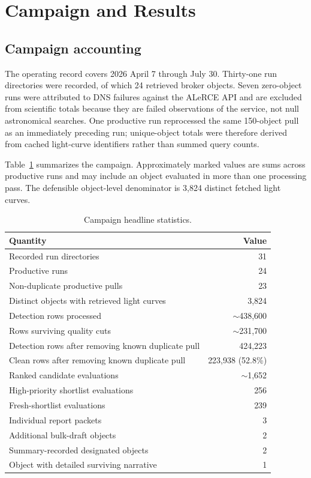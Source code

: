 \documentclass[11pt]{article}
\begin{document}
\section{Campaign and Results}
\label{sec:campaign}

\subsection{Campaign accounting}

The operating record covers 2026 April 7 through July 30. Thirty-one run directories were recorded, of which 24 retrieved broker objects. Seven zero-object runs were attributed to DNS failures against the ALeRCE API and are excluded from scientific totals because they are failed observations of the service, not null astronomical searches. One productive run reprocessed the same 150-object pull as an immediately preceding run; unique-object totals were therefore derived from cached light-curve identifiers rather than summed query counts.

Table~\ref{tab:headline} summarizes the campaign. Approximately marked values are sums across productive runs and may include an object evaluated in more than one processing pass. The defensible object-level denominator is 3,824 distinct fetched light curves.

\begin{table}[ht]
\centering
\caption{Campaign headline statistics.}
\label{tab:headline}
\begin{tabular}{lr}
\toprule
Quantity & Value \\
\midrule
Recorded run directories & 31 \\
Productive runs & 24 \\
Non-duplicate productive pulls & 23 \\
Distinct objects with retrieved light curves & 3,824 \\
Detection rows processed & $\sim$438,600 \\
Rows surviving quality cuts & $\sim$231,700 \\
Detection rows after removing known duplicate pull & 424,223 \\
Clean rows after removing known duplicate pull & 223,938 (52.8\%) \\
Ranked candidate evaluations & $\sim$1,652 \\
High-priority shortlist evaluations & 256 \\
Fresh-shortlist evaluations & 239 \\
Individual report packets & 3 \\
Additional bulk-draft objects & 2 \\
Summary-recorded designated objects & 2 \\
Object with detailed surviving narrative & 1 \\
\bottomrule
\end{tabular}
\end{table}
\end{document}
